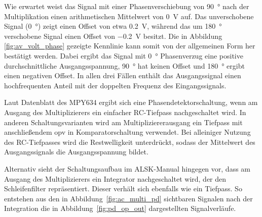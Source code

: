 \documentclass[../main.tex]{subfiles}
\begin{document}


Wie erwartet weist das Signal mit einer Phasenverschiebung von \SI{90}{\degree} nach der Multiplikation einen arithmetischen Mittelwert von \SI{0}{\volt} auf. Das unverschobene Signal (\SI{0}{\degree}) zeigt einen Offset von etwa \SI{0.2}{\volt}, während das um \SI{180}{\degree} verschobene Signal einen Offset von \SI{-0.2}{\volt} besitzt. Die in Abbildung \ref{fig:av_volt_phase} gezeigte Kennlinie kann somit von der allgemeinen Form her bestätigt werden. Dabei ergibt das Signal mit \SI{0}{\degree} Phasenverzug eine positive durchschnittliche Ausgangsspannung, \SI{90}{\degree} hat keinen Offset und \SI{180}{\degree} ergibt einen negativen Offset. In allen drei Fällen enthält das Ausgangssignal einen hochfrequenten Anteil mit der doppelten Frequenz des Eingangssignals.\par
\medskip

Laut Datenblatt des MPY634 ergibt sich eine Phasendetektorschaltung, wenn am Ausgang des Multiplizierers ein einfacher RC-Tiefpass nachgeschaltet wird. In anderen Schaltungsvarianten wird am Multipliziererausgang ein Tiefpass mit anschließendem \gls{opv} in Komparatorschaltung verwendet. Bei alleiniger Nutzung des RC-Tiefpasses wird die Restwelligkeit unterdrückt, sodass der Mittelwert des Ausgangssignals die Ausgangsspannung bildet.\par
\medskip

Alternativ sieht der Schaltungsaufbau im ALSK-Manual hingegen vor, dass am Ausgang des Multiplizierers ein Integrator nachgeschaltet wird, der den Schleifenfilter repräsentiert. Dieser verhält sich ebenfalls wie ein Tiefpass. So entstehen aus den in Abbildung~\ref{fig:ac_multi_pd} sichtbaren Signalen nach der Integration die in Abbildung~\ref{fig:pd_op_out} dargestellten Signalverläufe.\par
\medskip
\end{document}
